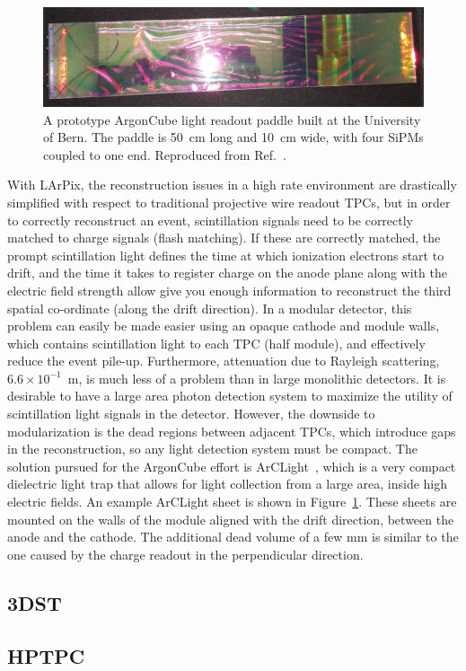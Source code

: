 \begin{figure}[!ht]
\centering
\includegraphics[width=0.75 \linewidth]{plots/1Film50x10.png}
\caption{A prototype ArgonCube light readout paddle built at the University of Bern. The paddle is 50~cm long and 10~cm wide, with four SiPMs coupled to one end. Reproduced from Ref.~\cite{argoncube_loi}.}
\label{fig:arclight}
\end{figure}
With LArPix, the reconstruction issues in a high rate environment are drastically simplified with respect to traditional projective wire readout TPCs, but in order to correctly reconstruct an event, scintillation signals need to be correctly matched to charge signals (flash matching). If these are correctly matched, the prompt scintillation light defines the time at which ionization electrons start to drift, and the time it takes to register charge on the anode plane along with the electric field strength allow give you enough information to reconstruct the third spatial co-ordinate (along the drift direction). In a modular detector, this problem can easily be made easier using an opaque cathode and module walls, which contains scintillation light to each TPC (half module), and effectively reduce the event pile-up. Furthermore, attenuation due to Rayleigh scattering,$6.6\times10^{-1}$~m, is much less of a problem than in large monolithic detectors. It is desirable to have a large area photon detection system to maximize the utility of scintillation light signals in the detector. However, the downside to modularization is the dead regions between adjacent TPCs, which introduce gaps in the reconstruction, so any light detection system must be compact. The solution pursued for the ArgonCube effort is ArCLight~\cite{arclight}, which is a very compact dielectric light trap that allows for light collection from a large area, inside high electric fields. An example ArCLight sheet is shown in Figure~\ref{fig:arclight}. These sheets are mounted on the walls of the module aligned with the drift direction, between the anode and the cathode. The additional dead volume of a few \si{\milli\metre} is similar to the one caused by the charge readout in the perpendicular direction.



\subsection{3DST}
\label{sec:3dst-design}

\subsection{HPTPC}
\label{sec:hptpc-design}

